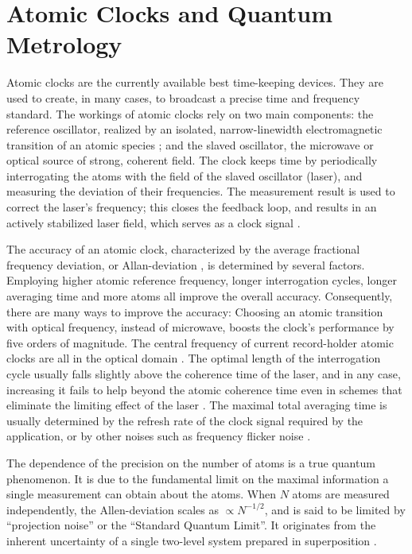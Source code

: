 \section{Atomic Clocks and Quantum Metrology}
Atomic clocks are the currently available best time-keeping devices. They are
used to create, in many cases, to broadcast a precise time and
frequency standard. The workings of atomic clocks rely on two main components: the
reference oscillator, realized by an isolated, narrow-linewidth electromagnetic
transition of an atomic species \cite{Derevianko2011}; and the slaved
oscillator, the microwave or optical source of strong, coherent field. The
clock keeps time by periodically interrogating the atoms with the field of the
slaved oscillator (laser), and measuring the deviation of their frequencies.
The measurement result is used to correct the laser's frequency; this
closes the feedback loop, and results in an actively stabilized laser field,
which serves as a clock signal \cite{Diddams2004}.

The accuracy of an atomic clock, characterized by the average fractional
frequency deviation, or Allan-deviation \cite{Allan1966, Rutman1978}, is
determined by several factors. Employing higher atomic reference frequency,
longer interrogation cycles, longer averaging time and more atoms all improve
the overall accuracy. Consequently, there are many ways to improve the accuracy:
Choosing an atomic transition with optical frequency, instead of microwave,
boosts the clock's performance by five orders of magnitude. The central
frequency of current record-holder atomic clocks are all in the optical domain
\cite{Ludlow2015}. The optimal length of the interrogation cycle usually falls
slightly above the coherence time of the laser, and in any case, increasing it
fails to help beyond the atomic coherence time even in schemes that eliminate
the limiting effect of the laser \cite{Borregaard2013, Rosenband2013}. The
maximal total averaging time is usually determined by the refresh rate of the
clock signal required by the application, or by other noises such as frequency
flicker noise \cite{Barnes1966}.

The dependence of the precision on the number of atoms is a true quantum
phenomenon.
It is due to the fundamental limit on the maximal information a single
measurement can obtain about the atoms. When $N$ atoms are measured
independently, the Allen-deviation scales as $\propto N^{-1/2}$, and is said to
be limited by ``projection noise'' or the ``Standard Quantum Limit''. It
originates from the inherent uncertainty of a single
two-level system prepared in superposition \cite{Santarelli1998}.
 
